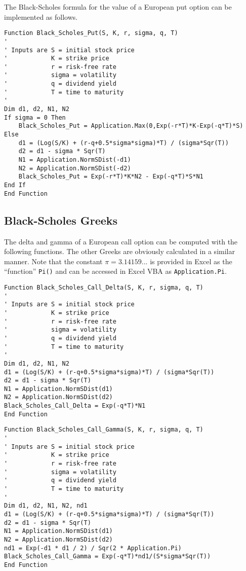 The Black-Scholes formula for the value of a European put option can be implemented as follows.
\small\begin{verbatim}
Function Black_Scholes_Put(S, K, r, sigma, q, T)
'
' Inputs are S = initial stock price
'            K = strike price
'            r = risk-free rate
'            sigma = volatility
'            q = dividend yield
'            T = time to maturity
'
Dim d1, d2, N1, N2
If sigma = 0 Then
    Black_Scholes_Put = Application.Max(0,Exp(-r*T)*K-Exp(-q*T)*S)
Else
    d1 = (Log(S/K) + (r-q+0.5*sigma*sigma)*T) / (sigma*Sqr(T))
    d2 = d1 - sigma * Sqr(T)
    N1 = Application.NormSDist(-d1)
    N2 = Application.NormSDist(-d2)
    Black_Scholes_Put = Exp(-r*T)*K*N2 - Exp(-q*T)*S*N1
End If
End Function
\end{verbatim}\normalsize

\subsection*{Black-Scholes Greeks}

The delta and gamma of a European call option can be computed with the following functions.  The other Greeks are obviously calculated in a similar manner.  Note that the constant $\pi = 3.14159...$ is provided in Excel as the ``function'' \verb!Pi()! and can be accessed in Excel VBA as \verb!Application.Pi!. 
\small\begin{verbatim}
Function Black_Scholes_Call_Delta(S, K, r, sigma, q, T)
'
' Inputs are S = initial stock price
'            K = strike price
'            r = risk-free rate
'            sigma = volatility
'            q = dividend yield
'            T = time to maturity
'
Dim d1, d2, N1, N2
d1 = (Log(S/K) + (r-q+0.5*sigma*sigma)*T) / (sigma*Sqr(T))
d2 = d1 - sigma * Sqr(T)
N1 = Application.NormSDist(d1)
N2 = Application.NormSDist(d2)
Black_Scholes_Call_Delta = Exp(-q*T)*N1
End Function
\end{verbatim}\normalsize

\small\begin{verbatim}
Function Black_Scholes_Call_Gamma(S, K, r, sigma, q, T)
'
' Inputs are S = initial stock price
'            K = strike price
'            r = risk-free rate
'            sigma = volatility
'            q = dividend yield
'            T = time to maturity
'
Dim d1, d2, N1, N2, nd1
d1 = (Log(S/K) + (r-q+0.5*sigma*sigma)*T) / (sigma*Sqr(T))
d2 = d1 - sigma * Sqr(T)
N1 = Application.NormSDist(d1)
N2 = Application.NormSDist(d2)
nd1 = Exp(-d1 * d1 / 2) / Sqr(2 * Application.Pi)
Black_Scholes_Call_Gamma = Exp(-q*T)*nd1/(S*sigma*Sqr(T))
End Function
\end{verbatim}\normalsize



